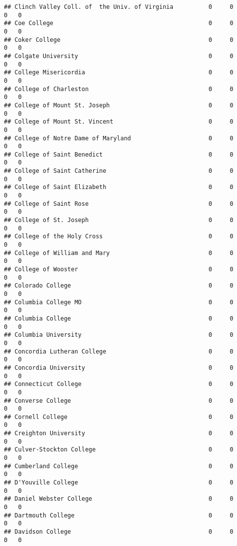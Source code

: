 \documentclass[
]{article}
\begin{document}
\begin{verbatim}
## Clinch Valley Coll. of  the Univ. of Virginia          0     0        0   0
## Coe College                                            0     0        0   0
## Coker College                                          0     0        0   0
## Colgate University                                     0     0        0   0
## College Misericordia                                   0     0        0   0
## College of Charleston                                  0     0        0   0
## College of Mount St. Joseph                            0     0        0   0
## College of Mount St. Vincent                           0     0        0   0
## College of Notre Dame of Maryland                      0     0        0   0
## College of Saint Benedict                              0     0        0   0
## College of Saint Catherine                             0     0        0   0
## College of Saint Elizabeth                             0     0        0   0
## College of Saint Rose                                  0     0        0   0
## College of St. Joseph                                  0     0        0   0
## College of the Holy Cross                              0     0        0   0
## College of William and Mary                            0     0        0   0
## College of Wooster                                     0     0        0   0
## Colorado College                                       0     0        0   0
## Columbia College MO                                    0     0        0   0
## Columbia College                                       0     0        0   0
## Columbia University                                    0     0        0   0
## Concordia Lutheran College                             0     0        0   0
## Concordia University                                   0     0        0   0
## Connecticut College                                    0     0        0   0
## Converse College                                       0     0        0   0
## Cornell College                                        0     0        0   0
## Creighton University                                   0     0        0   0
## Culver-Stockton College                                0     0        0   0
## Cumberland College                                     0     0        0   0
## D'Youville College                                     0     0        0   0
## Daniel Webster College                                 0     0        0   0
## Dartmouth College                                      0     0        0   0
## Davidson College                                       0     0        0   0

\end{verbatim}
\end{document}
